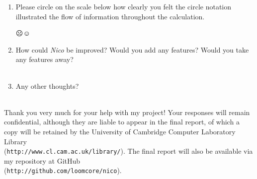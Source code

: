 \documentclass[14pt]{article}
\begin{document}
\begin{enumerate}
\item Please circle on the scale below how clearly you felt the circle notation
illustrated the flow of information throughout the calculation.

\begin{center}
{\Huge \vspace{-0.5cm}☹\hspace{0.25cm}{\bf ·}\hspace{0.25cm}{\bf ·}\hspace{0.25cm}{\bf ·}\hspace{0.25cm}☺\\}
\end{center}

\item How could \emph{Nico} be improved?  Would you add any features?  Would you
take any features away?\\

\fbox{
\begin{minipage}{17cm}
\hfill\vspace{3cm}
\end{minipage}
}\\

\item Any other thoughts?\\

\fbox{
\begin{minipage}{17cm}
\hfill\vspace{3cm}
\end{minipage}
}\\

\end{enumerate}

Thank you very much for your help with my project!  Your responses will remain
confidential, although they are liable to appear in the final report, of which a
copy will be retained by the University of Cambridge Computer Laboratory Library\\
(\verb¬http://www.cl.cam.ac.uk/library/¬).  The final report will also be
available via my repository at GitHub\\
(\verb¬http://github.com/loomcore/nico¬).
\end{document}
